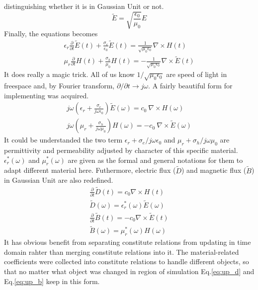 distinguishing whether it is in Gaussian Unit or not.
\label{eq:gaussian_unit}
\begin{equation}
  {\displaystyle\widetilde{E} = \sqrt{\frac{\epsilon_0}{\mu_0}}E}
\end{equation}
Finally, the equations becomes
\begin{gather}\label{eq:coordinate_transform}
  \epsilon_r\frac{\partial}{\partial t}\widetilde{E}(t) + \frac{\sigma_e}{\epsilon_0}\widetilde{E}(t) = \frac{1}{\sqrt{\mu_0\epsilon_0}}\nabla\times H(t)\\
  \mu_r\frac{\partial}{\partial t} H(t) + \frac{\sigma_h}{\mu_0}H(t) = - \frac{1}{\sqrt{\mu_0\epsilon_0}}\nabla\times\widetilde{E}(t)
\end{gather}
It does really a magic trick. All of us know $1/\sqrt{\mu_0\epsilon_0}$ are speed of light in freespace and, by Fourier
transform, $\partial/\partial t \rightarrow j\omega$. A fairly beautiful form for implementing was acquired.
\begin{gather}
  j\omega\left(\epsilon_r + \frac{\sigma_e}{j\omega\epsilon_0}\right)\widetilde{E}(\omega) = c_0\ \nabla\times H(\omega)\\
  j\omega\left(\mu_r + \frac{\sigma_h}{j\omega\mu_0}\right)H(\omega) = - c_0\ \nabla\times\widetilde{E}(\omega)
\end{gather}
It could be understanded the two term $\epsilon_r + \sigma_e/j\omega\epsilon_0$ and $\mu_r + \sigma_h/j\omega\mu_0$ are
permittivity and permeability adjusted by character of this specific material. $\epsilon_r^*(\omega)$ and
$\mu_r^*(\omega)$ are given as the formal and general notations for them to adapt different material here. Futhermore,
electric flux ($\widetilde{D}$) and magnetic flux ($\widetilde{B}$) in Gaussian Unit are also redefined.
\begin{gather}
  \frac{\partial}{\partial t}\widetilde{D}(t) = c_0\nabla\times H(t)\label{eq:up_d}\\
  \widetilde{D}(\omega) = \epsilon_r^*(\omega)\widetilde{E}(\omega)\label{eq:cr_d}\\
  \frac{\partial}{\partial t}\widetilde{B}(t) = -c_0\nabla\times\widetilde{E}(t)\label{eq:up_b}\\
  \widetilde{B}(\omega) = \mu_r^*(\omega)H(\omega)\label{eq:cr_b}
\end{gather}
It has obvious benefit from separating constitute relations from updating in time domain rahter than merging constitute
relations into it. The material-related coefficients were collected into constitute relations to handle different
objects, so that no matter what object was changed in region of simulation Eq.\ref{eq:up_d} and Eq.\ref{eq:up_b} keep in
this form.

